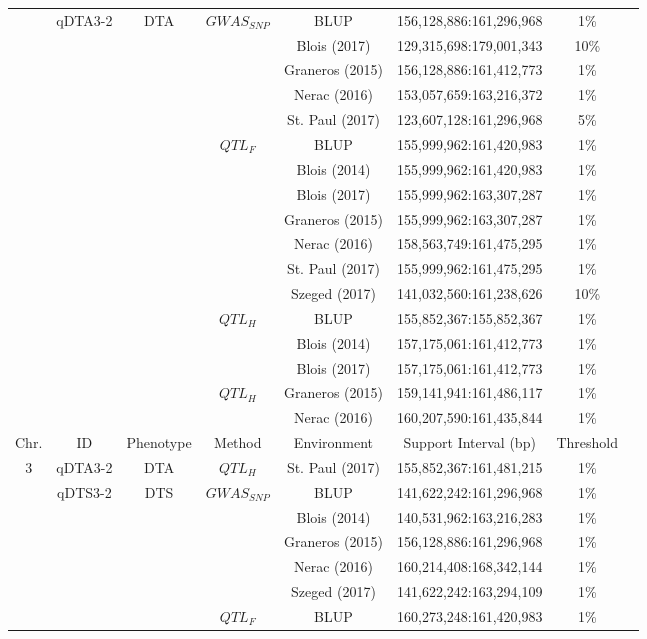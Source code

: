 \documentclass[9pt,twocolumn,twoside]{gsag3jnl}
\begin{document}
\begin{longtable}{c c c c c c c c}
&  qDTA3-2 & DTA & \multirow{1}{4em}{$GWAS_{SNP}$} & BLUP & 156,128,886:161,296,968 & 1\% \\
&  & & & Blois (2017) & 129,315,698:179,001,343 & 10\% \\
&  & & & Graneros (2015) & 156,128,886:161,412,773 & 1\% \\
&  & & & Nerac (2016) & 153,057,659:163,216,372 & 1\% \\
&  & & & St. Paul (2017) & 123,607,128:161,296,968 & 5\% \\
&  & & \multirow{1}{4em}{$QTL_F$} & BLUP & 155,999,962:161,420,983 & 1\% \\
&  & & & Blois (2014) & 155,999,962:161,420,983 & 1\% \\
&  & & & Blois (2017) & 155,999,962:163,307,287 & 1\% \\
&  & & & Graneros (2015) & 155,999,962:163,307,287 & 1\% \\
&  & & & Nerac (2016) & 158,563,749:161,475,295 & 1\% \\
&  & & & St. Paul (2017) & 155,999,962:161,475,295 & 1\% \\
&  & & & Szeged (2017) & 141,032,560:161,238,626 & 10\% \\
&  & & \multirow{1}{4em}{$QTL_H$} & BLUP & 155,852,367:155,852,367 & 1\% \\
&  & & & Blois (2014) & 157,175,061:161,412,773 & 1\% \\
&  & & & Blois (2017) & 157,175,061:161,412,773 & 1\% \\
& & & $QTL_H$ & Graneros (2015) & 159,141,941:161,486,117 & 1\% \\
&  & & & Nerac (2016) & 160,207,590:161,435,844 & 1\% \\
\hline \hline
Chr. & ID & Phenotype & Method & Environment & Support Interval (bp) & Threshold\\
\hline
3 & qDTA3-2 & DTA & $QTL_H$ & St. Paul (2017) & 155,852,367:161,481,215 & 1\% \\
&  qDTS3-2 & DTS & \multirow{1}{4em}{$GWAS_{SNP}$} & BLUP & 141,622,242:161,296,968 & 1\% \\
&  & & & Blois (2014) & 140,531,962:163,216,283 & 1\% \\
&  & & & Graneros (2015) & 156,128,886:161,296,968 & 1\% \\
&  & & & Nerac (2016) & 160,214,408:168,342,144 & 1\% \\
&  & & & Szeged (2017) & 141,622,242:163,294,109 & 1\% \\
&  & & \multirow{1}{4em}{$QTL_F$} & BLUP & 160,273,248:161,420,983 & 1\% \\

\end{longtable}
\end{document}

